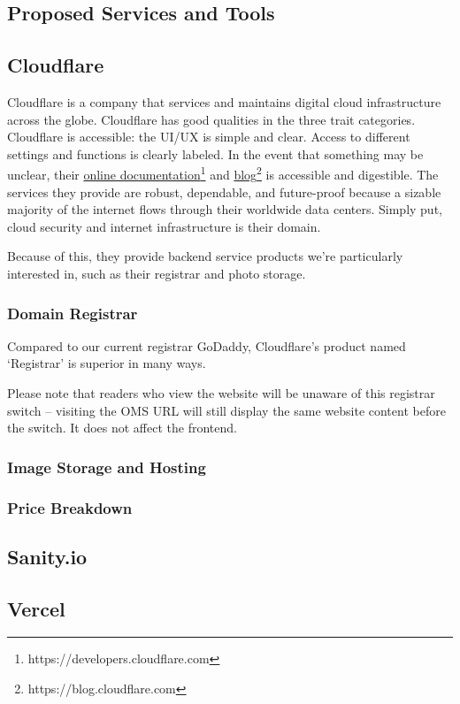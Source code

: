 \subsection{Proposed Services and Tools}

\subsection{Cloudflare}
Cloudflare is a company that services and maintains digital cloud infrastructure across the globe. Cloudflare has good qualities in the three trait categories. Cloudflare is accessible: the UI/UX is simple and clear. Access to different settings and functions is clearly labeled. In the event that something may be unclear, their \href{https://developers.cloudflare.com}{online documentation}\footnote{https://developers.cloudflare.com} and \href{https://blog.cloudflare.com/}{blog}\footnote{https://blog.cloudflare.com} is accessible and digestible. The services they provide are robust, dependable, and future-proof because a sizable majority of the internet flows through their worldwide data centers. Simply put, cloud security and internet infrastructure is their domain.

Because of this, they provide backend service products we're particularly interested in, such as their registrar and photo storage.


\subsubsection*{Domain Registrar}
Compared to our current registrar GoDaddy, Cloudflare's product named `Registrar' is superior in many ways.

Please note that readers who view the website will be unaware of this registrar switch – visiting the OMS URL will still display the same website content before the switch. It does not affect the frontend.

\subsubsection*{Image Storage and Hosting}

\subsubsection*{Price Breakdown}

\subsection{Sanity.io}

\subsection{Vercel}
